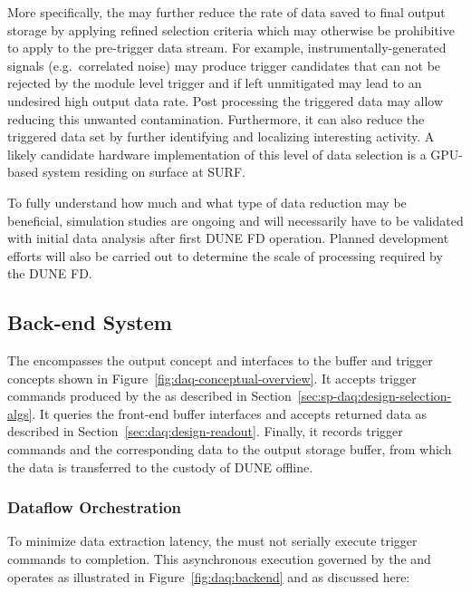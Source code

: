 More specifically, the  may further reduce the rate of data saved to final output storage by
applying refined selection criteria which may otherwise be prohibitive
to apply to the pre-trigger data stream.  For example, instrumentally-generated signals (e.g.~correlated noise)
may produce trigger candidates that can not be rejected by the module
level trigger and if left unmitigated may lead to an undesired high
output data rate. 
Post processing the triggered data may allow reducing this unwanted
contamination.
Furthermore, it can also reduce the triggered data set by further identifying
and localizing interesting activity. A likely candidate hardware
implementation of this level of data selection is a GPU-based system
residing on surface at SURF.

To fully understand how much and what type of data reduction may be
beneficial, simulation studies are ongoing \citedocdb{} and will
necessarily have to be
validated with initial data analysis after
first DUNE FD operation. Planned 
development efforts will also be carried out to determine the scale of
processing required by the DUNE FD.

\subsection{Back-end System}
\label{sec:fd-daq:design-backend}

The  encompasses the output concept and interfaces to the buffer and trigger concepts shown in Figure~\ref{fig:daq-conceptual-overview}. 
It accepts trigger commands produced by the  as described in Section~\ref{sec:sp-daq:design-selection-algs}. 
It queries the front-end buffer interfaces and accepts returned data as described in Section~\ref{sec:daq:design-readout}. 
Finally, it records trigger commands and the corresponding data to the output storage buffer, from which the data is transferred to the custody of DUNE offline.

\subsubsection{Dataflow Orchestration}

To minimize data extraction latency, the  must not serially execute trigger commands to completion. 
This asynchronous execution governed by the  and operates as illustrated in Figure~\ref{fig:daq:backend} and as discussed here:

